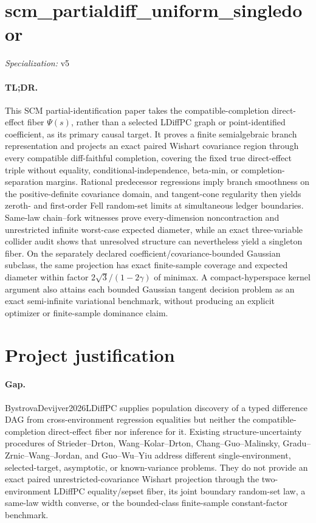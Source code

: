 \documentclass{article}
\begin{document}
\sloppy

\section*{scm\_\allowbreak{}partialdiff\_\allowbreak{}uniform\_\allowbreak{}singledoor}

\noindent\textit{Specialization:} v5\par

\paragraph{TL;DR.} This SCM partial-identification paper takes the compatible-completion direct-effect fiber \(\Psi(s)\), rather than a selected LDiffPC graph or point-identified coefficient, as its primary causal target. It proves a finite semialgebraic branch representation and projects an exact paired Wishart covariance region through every compatible diff-faithful completion, covering the fixed true direct-effect triple without equality, conditional-independence, beta-min, or completion-separation margins. Rational predecessor regressions imply branch smoothness on the positive-definite covariance domain, and tangent-cone regularity then yields zeroth- and first-order Fell random-set limits at simultaneous ledger boundaries. Same-law chain--fork witnesses prove every-dimension noncontraction and unrestricted infinite worst-case expected diameter, while an exact three-variable collider audit shows that unresolved structure can nevertheless yield a singleton fiber. On the separately declared coefficient/covariance-bounded Gaussian subclass, the same projection has exact finite-sample coverage and expected diameter within factor \(2\sqrt3/(1-2\gamma)\) of minimax. A compact-hyperspace kernel argument also attains each bounded Gaussian tangent decision problem as an exact semi-infinite variational benchmark, without producing an explicit optimizer or finite-sample dominance claim.

\section{Project justification}

\paragraph{Gap.} BystrovaDevijver2026LDiffPC supplies population discovery of a typed difference DAG from cross-environment regression equalities but neither the compatible-completion direct-effect fiber nor inference for it. Existing structure-uncertainty procedures of Strieder--Drton, Wang--Kolar--Drton, Chang--Guo--Malinsky, Gradu--Zrnic--Wang--Jordan, and Guo--Wu--Yiu address different single-environment, selected-target, asymptotic, or known-variance problems. They do not provide an exact paired unrestricted-covariance Wishart projection through the two-environment LDiffPC equality/sepset fiber, its joint boundary random-set law, a same-law width converse, or the bounded-class finite-sample constant-factor benchmark.
\end{document}
